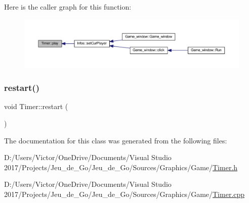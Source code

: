 Here is the caller graph for this function\+:
\nopagebreak
\begin{figure}[H]
\begin{center}
\leavevmode
\includegraphics[width=350pt]{class_timer_a84acbe09a8dddae46c997c57a70c5076_icgraph}
\end{center}
\end{figure}
\mbox{\label{class_timer_aa3f7871196bb56202af2bc982bfbfff6}} 
\subsubsection{\texorpdfstring{restart()}{restart()}}
{\footnotesize\ttfamily void Timer\+::restart (\begin{DoxyParamCaption}{ }\end{DoxyParamCaption})}



The documentation for this class was generated from the following files\+:\begin{DoxyCompactItemize}
\item 
D\+:/\+Users/\+Victor/\+One\+Drive/\+Documents/\+Visual Studio 2017/\+Projects/\+Jeu\+\_\+de\+\_\+\+Go/\+Jeu\+\_\+de\+\_\+\+Go/\+Sources/\+Graphics/\+Game/\hyperlink{_timer_8h}{Timer.\+h}\item 
D\+:/\+Users/\+Victor/\+One\+Drive/\+Documents/\+Visual Studio 2017/\+Projects/\+Jeu\+\_\+de\+\_\+\+Go/\+Jeu\+\_\+de\+\_\+\+Go/\+Sources/\+Graphics/\+Game/\hyperlink{_timer_8cpp}{Timer.\+cpp}\end{DoxyCompactItemize}
